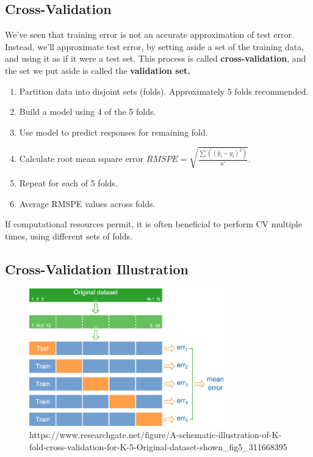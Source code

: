 \documentclass[
  letterpaper,
  DIV=11,
  numbers=noendperiod]{scrreprt}
\providecommand{\tightlist}{%
  \setlength{\itemsep}{0pt}\setlength{\parskip}{0pt}}\usepackage{longtable,booktabs,array}
\begin{document}
\subsection{Cross-Validation}\label{cross-validation}

We've seen that training error is not an accurate approximation of test
error. Instead, we'll approximate test error, by setting aside a set of
the training data, and using it as if it were a test set. This process
is called \textbf{cross-validation}, and the set we put aside is called
the \textbf{validation set.}

\begin{enumerate}
\def\labelenumi{\arabic{enumi}.}
\tightlist
\item
  Partition data into disjoint sets (folds). Approximately 5 folds
  recommended.\\
\item
  Build a model using 4 of the 5 folds.\\
\item
  Use model to predict responses for remaining fold.
\item
  Calculate root mean square error
  \(RMSPE=\displaystyle\sqrt{\frac{\sum((\hat{y}_i-y_i)^2)}{n'}}\).\\
\item
  Repeat for each of 5 folds.\\
\item
  Average RMSPE values across folds.
\end{enumerate}

If computational resources permit, it is often beneficial to perform CV
multiple times, using different sets of folds.

\subsection{Cross-Validation
Illustration}\label{cross-validation-illustration}

\begin{figure}[H]

{\centering \includegraphics[width=0.75\textwidth,height=\textheight]{CV2.png}

}

\caption{https://www.researchgate.net/figure/A-schematic-illustration-of-K-fold-cross-validation-for-K-5-Original-dataset-shown\_fig5\_311668395}

\end{figure}%
\end{document}
